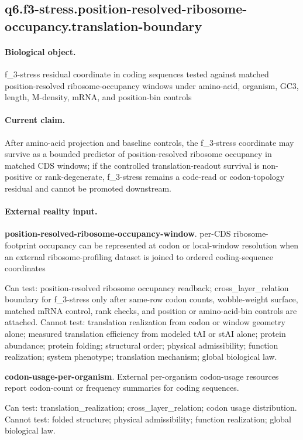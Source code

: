 \subsection{q6.f3-stress.position-resolved-ribosome-occupancy.translation-boundary}

\paragraph{Biological object.} f\_3-stress residual coordinate in coding sequences tested against matched position-resolved ribosome-occupancy windows under amino-acid, organism, GC3, length, M-density, mRNA, and position-bin controls

\paragraph{Current claim.} After amino-acid projection and baseline controls, the f\_3-stress coordinate may survive as a bounded predictor of position-resolved ribosome occupancy in matched CDS windows; if the controlled translation-readout survival is non-positive or rank-degenerate, f\_3-stress remains a code-read or codon-topology residual and cannot be promoted downstream.

\paragraph{External reality input.}
\textbf{position-resolved-ribosome-occupancy-window}. per-CDS ribosome-footprint occupancy can be represented at codon or local-window resolution when an external ribosome-profiling dataset is joined to ordered coding-sequence coordinates

Can test: position-resolved ribosome occupancy readback; cross\_layer\_relation boundary for f\_3-stress only after same-row codon counts, wobble-weight surface, matched mRNA control, rank checks, and position or amino-acid-bin controls are attached. Cannot test: translation realization from codon or window geometry alone; measured translation efficiency from modeled tAI or stAI alone; protein abundance; protein folding; structural order; physical admissibility; function realization; system phenotype; translation mechanism; global biological law.

\textbf{codon-usage-per-organism}. External per-organism codon-usage resources report codon-count or frequency summaries for coding sequences.

Can test: translation\_realization; cross\_layer\_relation; codon usage distribution. Cannot test: folded structure; physical admissibility; function realization; global biological law.

